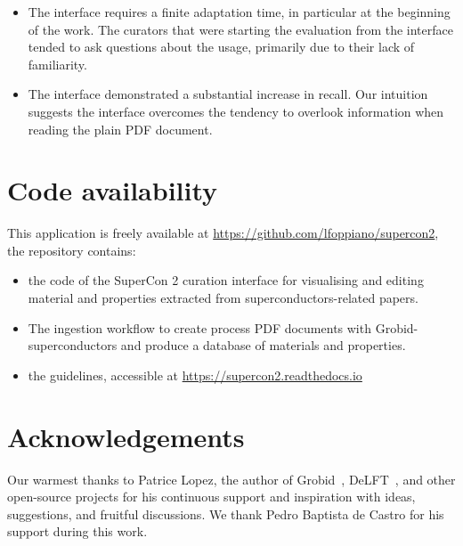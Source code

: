 \documentclass[a4paper]{article}
\begin{document}
\begin{itemize}
    \item The interface requires a finite adaptation time, in particular at the beginning of the work. The curators that were starting the evaluation from the interface tended to ask questions about the usage, primarily due to their lack of familiarity. 
    \item The interface demonstrated a substantial increase in recall. Our intuition suggests the interface overcomes the tendency to overlook information when reading the plain PDF document.
\end{itemize}


\section{Code availability}
This application is freely available at \url{https://github.com/lfoppiano/supercon2}, the repository contains:
\begin{itemize}
\item the code of the SuperCon 2 curation interface for visualising and editing material and properties extracted from superconductors-related papers.
\item The ingestion workflow to create process PDF documents with Grobid-superconductors and produce a database of materials and properties.
\item the guidelines, accessible at \url{https://supercon2.readthedocs.io}
\end{itemize}

\section{Acknowledgements}
Our warmest thanks to Patrice Lopez, the author of Grobid~\cite{GROBID}, DeLFT~\cite{DeLFT}, and other open-source projects for his continuous support and inspiration with ideas, suggestions, and fruitful discussions.
We thank Pedro Baptista de Castro for his support during this work. 
\end{document}
